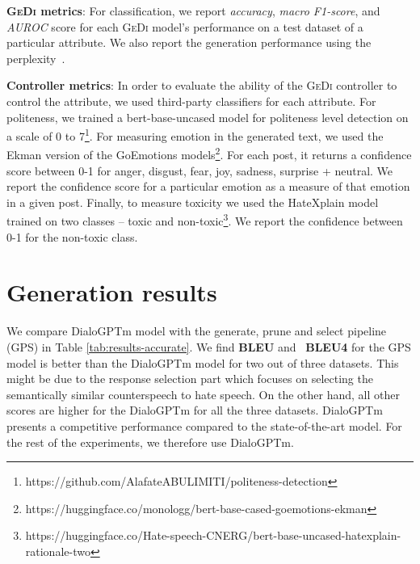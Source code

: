 \noindent\textbf{\textsc{GeDi} metrics}: For classification, we report \textit{accuracy}, \textit{macro F1-score}, and \textit{AUROC} score for each \textsc{GeDi} model's performance on a test dataset of a particular attribute. We also report the generation performance using the perplexity~\cite{zhang2020dialogpt}.\newline


\noindent\textbf{Controller metrics}: In order to evaluate the ability of the \textsc{GeDi} controller to control the attribute, we used third-party classifiers for each attribute. For politeness, we trained a bert-base-uncased model for politeness level detection on a scale of 0 to 7\footnote{\footnotesize https://github.com/AlafateABULIMITI/politeness-detection}. For measuring emotion in the generated text, we used the Ekman version of the GoEmotions models\footnote{\footnotesize https://huggingface.co/monologg/bert-base-cased-goemotions-ekman}. For each post, it returns a confidence score between 0-1 for anger, disgust, fear, joy, sadness, surprise + neutral.  We report the confidence score for a particular emotion as a measure of that emotion in a given post. Finally, to measure toxicity we used the HateXplain model~\cite{mathew2020hatexplain} trained on two classes -- toxic and non-toxic\footnote{\footnotesize https://huggingface.co/Hate-speech-CNERG/bert-base-uncased-hatexplain-rationale-two}. We report the confidence between 0-1 for the non-toxic class.



\section{Generation results} 
We compare DialoGPTm model with the generate, prune and select pipeline (GPS) in Table \ref{tab:results-accurate}. We find \textbf{BLEU} and ~\textbf{BLEU4} for the GPS model is better than the DialoGPTm model for two out of three datasets. This might be due to the response selection part which focuses on selecting the semantically similar counterspeech to hate speech. On the other hand, all other scores are higher for the DialoGPTm for all the three datasets. DialoGPTm presents a competitive performance compared to the state-of-the-art model. For the rest of the experiments, we therefore use DialoGPTm. 


